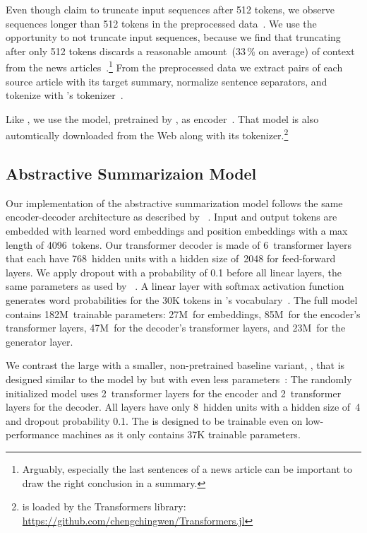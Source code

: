 Even though \citeauthor{LiuL2019} claim to truncate input sequences after 512 tokens, we observe sequences longer than 512 tokens in the preprocessed data~\cite{LiuL2019}.
We use the opportunity to not truncate input sequences, because we find that truncating after only 512 tokens discards a reasonable amount~(33\,\% on average) of context from the news articles~\cite{NallapatiZSGX2016}.\footnote{Arguably, especially the last sentences of a news article can be important to draw the right conclusion in a summary.}
From the preprocessed data we extract pairs of each source article with its target summary, normalize sentence separators, and tokenize with \Bert's \WordPiece tokenizer~\cite{DevlinCLT2019}.

Like \citeauthor{LiuL2019}, we use the \BertBase model, pretrained by \citeauthor{DevlinCLT2019}, as encoder~\cite{DevlinCLT2019}.
That \Bert model is also automtically downloaded from the Web along with its \WordPiece tokenizer.\footnote{\Bert is loaded by the Transformers library: \url{https://github.com/chengchingwen/Transformers.jl}}

\subsection{Abstractive Summarizaion Model}

Our implementation of the \BertSumAbs abstractive summarization model follows the same encoder-decoder architecture as described by \citeauthor{LiuL2019}~\cite{LiuL2019}.
Input and output tokens are embedded with learned word embeddings and position embeddings with a max length of 4096~tokens.
Our transformer decoder is made of 6~transformer layers that each have 768~hidden units with a hidden size of~2048 for feed-forward layers.
We apply dropout with a probability of 0.1 before all linear layers, the same parameters as used by \citeauthor{LiuL2019}~\cite{LiuL2019}.
A linear layer with softmax activation function generates word probabilities for the 30K tokens in \Bert's vocabulary~\cite{DevlinCLT2019}.
The full \BertSumAbs model contains 182M~trainable parameters: 27M~for embeddings, 85M~for the encoder's transformer layers, 47M~for the decoder's transformer layers, and 23M~for the generator layer.

We contrast the large \BertSumAbs with a smaller, non-pretrained baseline variant, \TransformerAbsTiny, that is designed similar to the \TransformerAbs model by \citeauthor{LiuL2019} but with even less parameters~\cite{LiuL2019}: The randomly initialized model uses 2~transformer layers for the encoder and 2~transformer layers for the decoder. All layers have only 8~hidden units with a hidden size of~4 and dropout probability 0.1.
The \TransformerAbsTiny is designed to be trainable even on low-performance machines as it only contains 37K trainable parameters.

